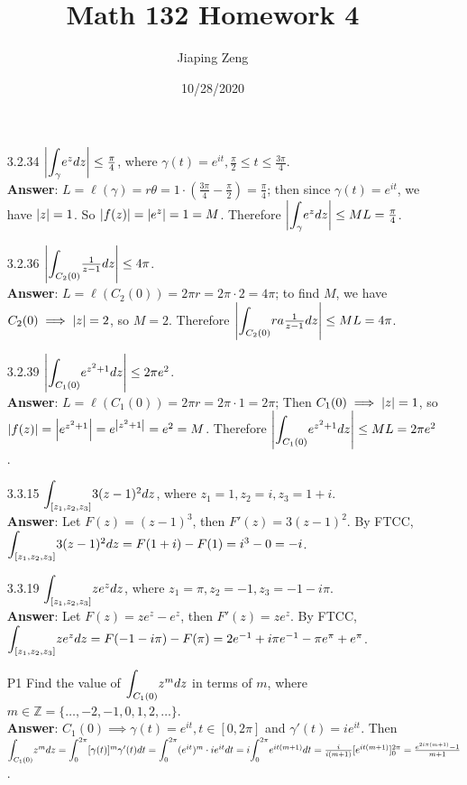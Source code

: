\documentclass{article}
\title{Math 132 Homework 4}
\date{10/28/2020}
\author{Jiaping Zeng}
\begin{document}
\maketitle

\begin{itemize}
    \item [3.2.34] $\abs{\mathlarger{\int_\gamma}e^zdz}\leq\frac{\pi}{4}$, where $\gamma(t)=e^{it},\frac{\pi}{2}\leq t\leq\frac{3\pi}{4}$.\\
          \textbf{Answer}: $L=\ell(\gamma)=r\theta=1\cdot(\frac{3\pi}{4}-\frac{\pi}{2})=\frac{\pi}{4}$; then since $\gamma(t)=e^{it}$, we have $\abs{z}=1$. So $\abs{f(z)}=\abs{e^z}=1=M$. Therefore $\abs{\mathlarger{\int_\gamma}e^zdz}\leq ML=\frac{\pi}{4}$.
    \item [3.2.36] $\abs{\mathlarger{\int_{C_2(0)}}\frac{1}{z-1}dz}\leq 4\pi$.\\
          \textbf{Answer}: $L=\ell(C_2(0))=2\pi r=2\pi\cdot 2=4\pi$; to find $M$, we have $C_2(0)\implies\abs{z}=2$, so $M=2$. Therefore $\abs{\mathlarger{\int_{C_2(0)}}ra\frac{1}{z-1}dz}\leq ML=4\pi$.
    \item [3.2.39] $\abs{\mathlarger{\int_{C_1(0)}}e^{z^2+1}dz}\leq 2\pi e^2$.\\
          \textbf{Answer}: $L=\ell(C_1(0))=2\pi r=2\pi\cdot 1=2\pi$; Then $C_1(0)\implies\abs{z}=1$, so $\abs{f(z)}=\abs{e^{z^2+1}}=e^{\abs{z^2+1}}=e^2=M$. Therefore $\abs{\mathlarger{\int_{C_1(0)}}e^{z^2+1}dz}\leq ML=2\pi e^2$.
    \item [3.3.15] $\mathlarger{\int_{[z_1,z_2,z_3]}}3(z-1)^2dz$, where $z_1=1,z_2=i,z_3=1+i$.\\
          \textbf{Answer}: Let $F(z)=(z-1)^3$, then $F'(z)=3(z-1)^2$. By FTCC, $\mathlarger{\int_{[z_1,z_2,z_3]}}3(z-1)^2dz=F(1+i)-F(1)=i^3-0=-i$.
    \item [3.3.19] $\mathlarger{\int_{[z_1,z_2,z_3]}}ze^zdz$, where $z_1=\pi,z_2=-1,z_3=-1-i\pi$.\\
    \textbf{Answer}: Let $F(z)=ze^z-e^z$, then $F'(z)=ze^z$. By FTCC, $\mathlarger{\int_{[z_1,z_2,z_3]}}ze^zdz=F(-1-i\pi)-F(\pi)=2e^{-1}+i\pi e^{-1}-\pi e^\pi+e^\pi$.
    \item [P1] Find the value of $\mathlarger{\int_{C_1(0)}}z^mdz$ in terms of $m$, where $m\in\mathbb{Z}=\{\ldots,-2,-1,0,1,2,\ldots\}$.\\
          \textbf{Answer}: $C_1(0)\implies\gamma(t)=e^{it},t\in[0,2\pi]$ and $\gamma'(t)=ie^{it}$. Then $\mathlarger{\int_{C_1(0)}}z^mdz=\mathlarger{\int_0^{2\pi}}[\gamma(t)]^m\gamma'(t)dt=\mathlarger{\int_0^{2\pi}}(e^{it})^m\cdot ie^{it}dt=i\mathlarger{\int_0^{2\pi}}e^{it(m+1)}dt=\frac{i}{i(m+1)}[e^{it(m+1)}]_0^{2\pi}=\frac{e^{2i\pi(m+1)}-1}{m+1}$.

\end{itemize}
\end{document}
